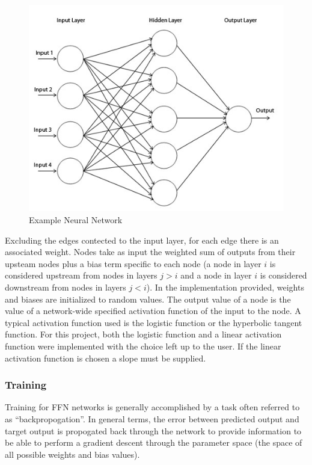 \documentclass[conference]{IEEEtran}
\begin{document}
  \begin{figure}
    \centering
    \includegraphics[width=\linewidth]{network.jpg}
    \caption{Example Neural Network}
    \label{fig:exampleNetwork}
  \end{figure}

  Excluding the edges contected to the input layer, for each edge there is an associated weight. Nodes take as input the weighted sum of outputs from their upsteam nodes plus a bias term specific to each node (a node in layer $i$ is considered upstream from nodes in layers $j>i$ and a node in layer $i$ is considered downstream from nodes in layers $j<i$). In the implementation provided, weights and biases are initialized to random values. The output value of a node is the value of a network-wide specified activation function of the input to the node. A typical activation function used is the logistic function or the hyperbolic tangent function. For this project, both the logistic function and a linear activation function were implemented with the choice left up to the user. If the linear activation function is chosen a slope must be supplied.

    \subsubsection{Training}
    Training for FFN networks is generally accomplished by a task often referred to as ``backpropogation''. In general terms, the error between predicted output and target output is propogated back through the network to provide information to be able to perform a gradient descent through the parameter space (the space of all possible weights and bias values).
  
\end{document}
